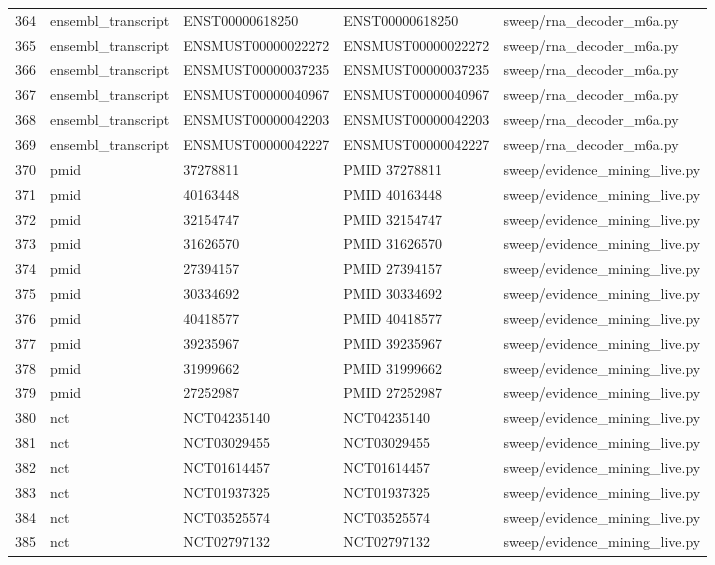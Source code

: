 {\begin{longtable}{rllp{3.2cm}p{4.2cm}}
364 & ensembl\_transcript & ENST00000618250 & ENST00000618250 & sweep/rna\_decoder\_m6a.py\\
365 & ensembl\_transcript & ENSMUST00000022272 & ENSMUST00000022272 & sweep/rna\_decoder\_m6a.py\\
366 & ensembl\_transcript & ENSMUST00000037235 & ENSMUST00000037235 & sweep/rna\_decoder\_m6a.py\\
367 & ensembl\_transcript & ENSMUST00000040967 & ENSMUST00000040967 & sweep/rna\_decoder\_m6a.py\\
368 & ensembl\_transcript & ENSMUST00000042203 & ENSMUST00000042203 & sweep/rna\_decoder\_m6a.py\\
369 & ensembl\_transcript & ENSMUST00000042227 & ENSMUST00000042227 & sweep/rna\_decoder\_m6a.py\\
370 & pmid & 37278811 & PMID 37278811 & sweep/evidence\_mining\_live.py\\
371 & pmid & 40163448 & PMID 40163448 & sweep/evidence\_mining\_live.py\\
372 & pmid & 32154747 & PMID 32154747 & sweep/evidence\_mining\_live.py\\
373 & pmid & 31626570 & PMID 31626570 & sweep/evidence\_mining\_live.py\\
374 & pmid & 27394157 & PMID 27394157 & sweep/evidence\_mining\_live.py\\
375 & pmid & 30334692 & PMID 30334692 & sweep/evidence\_mining\_live.py\\
376 & pmid & 40418577 & PMID 40418577 & sweep/evidence\_mining\_live.py\\
377 & pmid & 39235967 & PMID 39235967 & sweep/evidence\_mining\_live.py\\
378 & pmid & 31999662 & PMID 31999662 & sweep/evidence\_mining\_live.py\\
379 & pmid & 27252987 & PMID 27252987 & sweep/evidence\_mining\_live.py\\
380 & nct & NCT04235140 & NCT04235140 & sweep/evidence\_mining\_live.py\\
381 & nct & NCT03029455 & NCT03029455 & sweep/evidence\_mining\_live.py\\
382 & nct & NCT01614457 & NCT01614457 & sweep/evidence\_mining\_live.py\\
383 & nct & NCT01937325 & NCT01937325 & sweep/evidence\_mining\_live.py\\
384 & nct & NCT03525574 & NCT03525574 & sweep/evidence\_mining\_live.py\\
385 & nct & NCT02797132 & NCT02797132 & sweep/evidence\_mining\_live.py\\

\end{longtable}}
